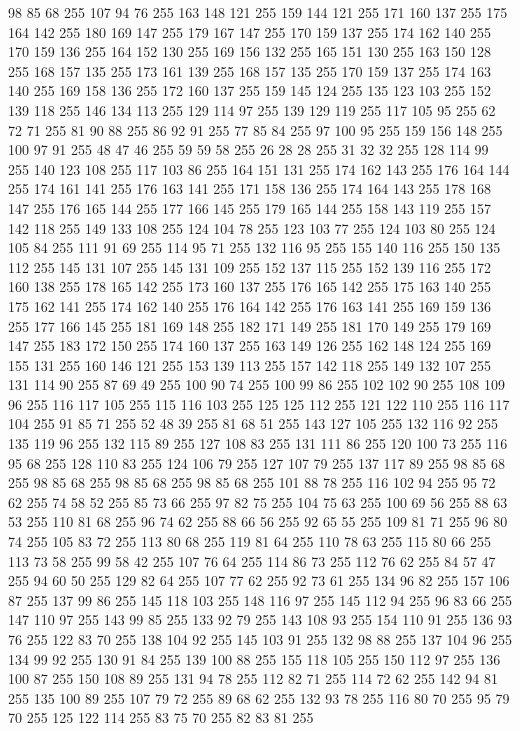 98 85 68 255 107 94 76 255 163 148 121 255 159 144 121 255 171 160 137 255 175 164 142 255 180 169 147 255 179 167 147 255 170 159 137 255 174 162 140 255 170 159 136 255 164 152 130 255 169 156 132 255 165 151 130 255 163 150 128 255 168 157 135 255 173 161 139 255 168 157 135 255 170 159 137 255 174 163 140 255 169 158 136 255 172 160 137 255 159 145 124 255 135 123 103 255 152 139 118 255 146 134 113 255 129 114 97 255 139 129 119 255 117 105 95 255 62 72 71 255 81 90 88 255 86 92 91 255 77 85 84 255 97 100 95 255 159 156 148 255 100 97 91 255 48 47 46 255 59 59 58 255 26 28 28 255 31 32 32 255 128 114 99 255 140 123 108 255 117 103 86 255 164 151 131 255 174 162 143 255 176 164 144 255 174 161 141 255 176 163 141 255 171 158 136 255 174 164 143 255 178 168 147 255 176 165 144 255 177 166 145 255 179 165 144 255 158 143 119 255 157 142 118 255 149 133 108 255 124 104 78 255 123 103 77 255 124 103 80 255 124 105 84 255 111 91 69 255 114 95 71 255 132 116 95 255
155 140 116 255 150 135 112 255 145 131 107 255 145 131 109 255 152 137 115 255 152 139 116 255 172 160 138 255 178 165 142 255 173 160 137 255 176 165 142 255 175 163 140 255 175 162 141 255 174 162 140 255 176 164 142 255 176 163 141 255 169 159 136 255 177 166 145 255 181 169 148 255 182 171 149 255 181 170 149 255 179 169 147 255 183 172 150 255 174 160 137 255 163 149 126 255 162 148 124 255 169 155 131 255 160 146 121 255 153 139 113 255 157 142 118 255 149 132 107 255 131 114 90 255 87 69 49 255 100 90 74 255 100 99 86 255 102 102 90 255 108 109 96 255 116 117 105 255 115 116 103 255 125 125 112 255 121 122 110 255 116 117 104 255 91 85 71 255 52 48 39 255 81 68 51 255 143 127 105 255 132 116 92 255 135 119 96 255 132 115 89 255 127 108 83 255 131 111 86 255 120 100 73 255 116 95 68 255 128 110 83 255 124 106 79 255 127 107 79 255 137 117 89 255 98 85 68 255 98 85 68 255 98 85 68 255 98 85 68 255 101 88 78 255 116 102 94 255 95 72 62 255 74 58 52 255
85 73 66 255 97 82 75 255 104 75 63 255 100 69 56 255 88 63 53 255 110 81 68 255 96 74 62 255 88 66 56 255 92 65 55 255 109 81 71 255 96 80 74 255 105 83 72 255 113 80 68 255 119 81 64 255 110 78 63 255 115 80 66 255 113 73 58 255 99 58 42 255 107 76 64 255 114 86 73 255 112 76 62 255 84 57 47 255 94 60 50 255 129 82 64 255 107 77 62 255 92 73 61 255 134 96 82 255 157 106 87 255 137 99 86 255 145 118 103 255 148 116 97 255 145 112 94 255 96 83 66 255 147 110 97 255 143 99 85 255 133 92 79 255 143 108 93 255 154 110 91 255 136 93 76 255 122 83 70 255 138 104 92 255 145 103 91 255 132 98 88 255 137 104 96 255 134 99 92 255 130 91 84 255 139 100 88 255 155 118 105 255 150 112 97 255 136 100 87 255 150 108 89 255 131 94 78 255 112 82 71 255 114 72 62 255 142 94 81 255 135 100 89 255 107 79 72 255 89 68 62 255 132 93 78 255 116 80 70 255 95 79 70 255 125 122 114 255 83 75 70 255 82 83 81 255

